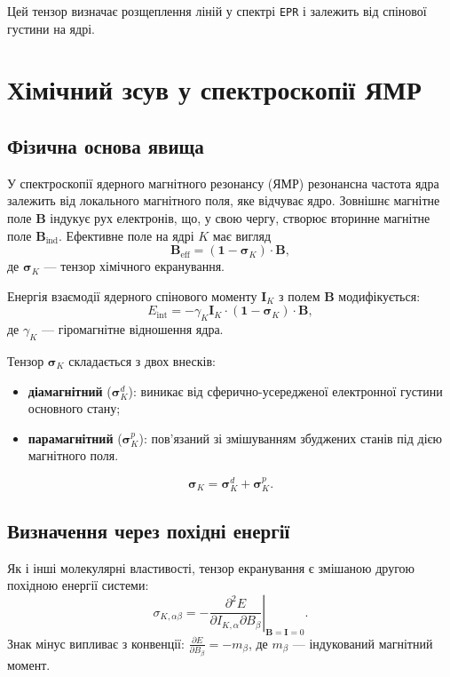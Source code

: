 Цей тензор визначає розщеплення ліній у спектрі \texttt{EPR} і залежить від спінової густини на ядрі.

\section{Хімічний зсув у спектроскопії ЯМР}

\subsection{Фізична основа явища}

У спектроскопії ядерного магнітного резонансу (ЯМР) резонансна частота ядра залежить від локального магнітного поля, яке відчуває ядро. Зовнішнє магнітне поле \(\mathbf B\) індукує рух електронів, що, у свою чергу, створює вторинне магнітне поле \(\mathbf B_{\text{ind}}\). Ефективне поле на ядрі \(K\) має вигляд
\begin{equation}
\mathbf B_{\text{eff}} = (\mathbf 1 - \boldsymbol\sigma_K) \cdot \mathbf B,
\end{equation}
де \(\boldsymbol\sigma_K\) — тензор хімічного екранування.

Енергія взаємодії ядерного спінового моменту \(\mathbf I_K\) з полем \(\mathbf B\) модифікується:
\begin{equation}
E_{\text{int}} = -\gamma_K \mathbf I_K \cdot (\mathbf 1 - \boldsymbol\sigma_K) \cdot \mathbf B,
\label{eq:E_int_shielding}
\end{equation}
де \(\gamma_K\) — гіромагнітне відношення ядра.

Тензор \(\boldsymbol\sigma_K\) складається з двох внесків:
\begin{itemize}
	\item \textbf{діамагнітний} (\(\boldsymbol\sigma_K^d\)): виникає від сферично-усередженої електронної густини основного стану;
	\item \textbf{парамагнітний} (\(\boldsymbol\sigma_K^p\)): пов’язаний зі змішуванням збуджених станів під дією магнітного поля.
\end{itemize}
\[
\boldsymbol\sigma_K = \boldsymbol\sigma_K^d + \boldsymbol\sigma_K^p.
\]

\subsection{Визначення через похідні енергії}

Як і інші молекулярні властивості, тензор екранування є змішаною другою похідною енергії системи:
\begin{equation}
\sigma_{K,\alpha\beta}
= -\left.\frac{\partial^2 E}{\partial I_{K,\alpha} \partial B_\beta}\right|_{\mathbf B=\mathbf I=0}.
\label{eq:sigma_derivative}
\end{equation}
Знак мінус випливає з конвенції: \(\frac{\partial E}{\partial B_\beta} = -m_\beta\), де \(m_\beta\) — індукований магнітний момент.

